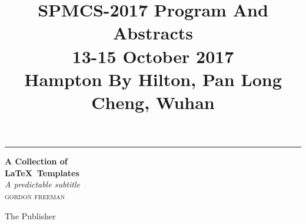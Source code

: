 \documentclass[oneside,A4paper,12pt]{article}
\date{}
\title{SPMCS-2017 Program And Abstracts\\\medskip
\large 13-15 October 2017 \\  Hampton By Hilton, Pan Long Cheng, Wuhan}
\begin{document}
\maketitle
\begin{titlepage} %
	
	\raggedleft %
	
	\rule{1pt}{\textheight} %
	\hspace{0.05\textwidth} %
	\parbox[b]{0.75\textwidth}{ %
		
		{\Huge\bfseries A Collection of \\[0.5\baselineskip] \LaTeX ~Templates}\\[2\baselineskip] %
		{\large\textit{A predictable subtitle}}\\[4\baselineskip] %
		{\Large\textsc{gordon freeman}} %
		
		\vspace{0.5\textheight} %
		
		{\noindent The Publisher~~\plogo}\\[\baselineskip] %
	}

\end{titlepage}
\end{document}
